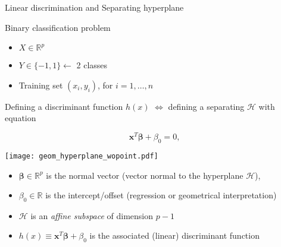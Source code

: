 \begin{frame}{Linear discrimination and Separating hyperplane}

  \begin{block}{Binary classification problem}
  \begin{itemize}
     \item $X \in \mathbb{R}^p$
     \item $Y \in \{-1,1\} \leftarrow $ 2 classes
     \item Training set $(x_i,y_i)$, for $i=1,\ldots,n$
  \end{itemize}
  \end{block}

 Defining a  discriminant function $h(x)$
 $\Leftrightarrow$ defining a separating  $\mathcal{H}$ with equation\\
  \begin{minipage}{.4\textwidth}
\begin{center}
                   $$
 \boldsymbol{x}^T \boldsymbol{\beta} + \beta_0 = 0,
 $$
\end{center}
\end{minipage}
\quad
 \begin{minipage}{.3\textwidth}
  \begin{center}
   \texttt{[image: geom\_hyperplane\_wopoint.pdf]}
  \end{center}
 \end{minipage}


\begin{itemize}
 \item $\boldsymbol{\beta} \in \mathbb{R}^p$ is the normal vector (vector normal to the hyperplane $\mathcal{H}$),
 \item $\beta_0 \in \mathbb{R}$ is the intercept/offset (regression or geometrical interpretation)
 \item[\doigt] $\mathcal{H}$ is an {\em affine subspace} of dimension $p-1$
 \item[\doigt] $h(x)\equiv \boldsymbol{x}^T \boldsymbol{\beta} + \beta_0$ is the associated (linear) discriminant function
\end{itemize}


\end{frame}





